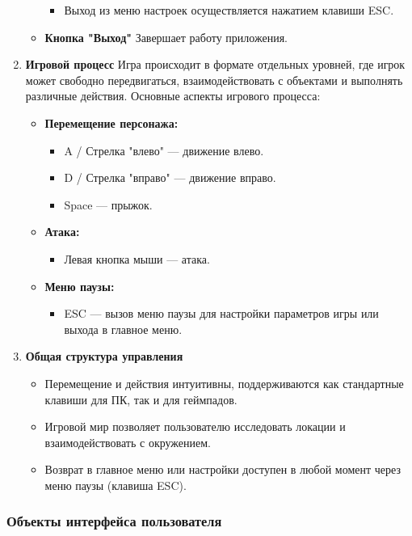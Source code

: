 \documentclass{article}
\begin{document}
\begin{enumerate}
\begin{itemize}
\begin{itemize}
\begin{itemize}
			\end{itemize}
			\item Выход из меню настроек осуществляется нажатием клавиши ESC.
		\end{itemize}
		\item \textbf{Кнопка "Выход"}
		Завершает работу приложения.
	\end{itemize}
	\item \textbf{Игровой процесс}
	Игра происходит в формате отдельных уровней, где игрок может свободно передвигаться, взаимодействовать с объектами и выполнять различные действия. Основные аспекты игрового процесса:
	\begin{itemize}
		\item \textbf{Перемещение персонажа:}
		\begin{itemize}
			\item A / Стрелка "влево" — движение влево.
			\item D / Стрелка "вправо" — движение вправо.
			\item Space — прыжок.
		\end{itemize}
		\item \textbf{Атака:}
		\begin{itemize}
			\item Левая кнопка мыши — атака.
		\end{itemize}
		\item \textbf{Меню паузы:}
		\begin{itemize}
			\item ESC — вызов меню паузы для настройки параметров игры или выхода в главное меню.
		\end{itemize}
	\end{itemize}
	\item \textbf{Общая структура управления}
	\begin{itemize}
		\item Перемещение и действия интуитивны, поддерживаются как стандартные клавиши для ПК, так и для геймпадов.
		\item Игровой мир позволяет пользователю исследовать локации и взаимодействовать с окружением.
		\item Возврат в главное меню или настройки доступен в любой момент через меню паузы (клавиша ESC).
	\end{itemize}
\end{enumerate}


\clearpage %

\subsubsection{Объекты интерфейса пользователя}
\end{document}
